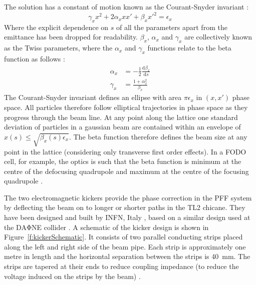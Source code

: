 The solution has a constant of motion known as the Courant-Snyder invariant \cite{courant}:
\begin{equation}
\gamma_x x^2 + 2\alpha_x x x' + \beta_x x'^2 = \epsilon_x 
\end{equation}
Where the explicit dependence on \(s\) of all the parameters apart from the emittance has been dropped for readability. \(\beta_{x}\), \(\alpha_{x}\) and \(\gamma_{x}\) are collectively known as the Twiss parameters, where the \(\alpha_x\) and \(\gamma_x\) functions relate to the beta function as follows \cite{wilson}:
\begin{align}
\alpha_x &= -\frac{1}{2}\frac{\mathrm{d}\beta_x}{\mathrm{d}s} \\
\gamma_x &= \frac{1+\alpha_x^2}{\beta_x}
\end{align}
The Courant-Snyder invariant defines an ellipse with area \(\pi\epsilon_x\) in \((x, x')\) phase space. All particles therefore follow elliptical trajectories in phase space as they progress through the beam line. At any point along the lattice one standard deviation of particles in a gaussian beam are contained within an envelope of \(x(s) \leq \sqrt{\beta_x(s)\epsilon_x}\). The beta function therefore defines the beam size at any point in the lattice (considering only transverse first order effects). In a FODO cell, for example, the optics is such that the beta function is minimum at the centre of the defocusing quadrupole and maximum at the centre of the focusing quadrupole \cite{wilson}.


The two electromagnetic kickers provide the phase correction in the PFF system by deflecting the beam on to longer or shorter paths in the TL2 chicane. They have been designed and built by INFN, Italy \cite{infn}, based on a similar design used at the DA\(\mathrm{\Phi}\)NE collider \cite{dafneKick}. A schematic of the kicker design is shown in Figure~\ref{f:kickerSchematic}. It consists of two parallel conducting strips placed along the left and right side of the beam pipe. Each strip is approximately one metre in length and the horizontal separation between the strips is 40~mm. The strips are tapered at their ends to reduce coupling impedance (to reduce the voltage induced on the strips by the beam) \cite{kickerIPAC11}.

